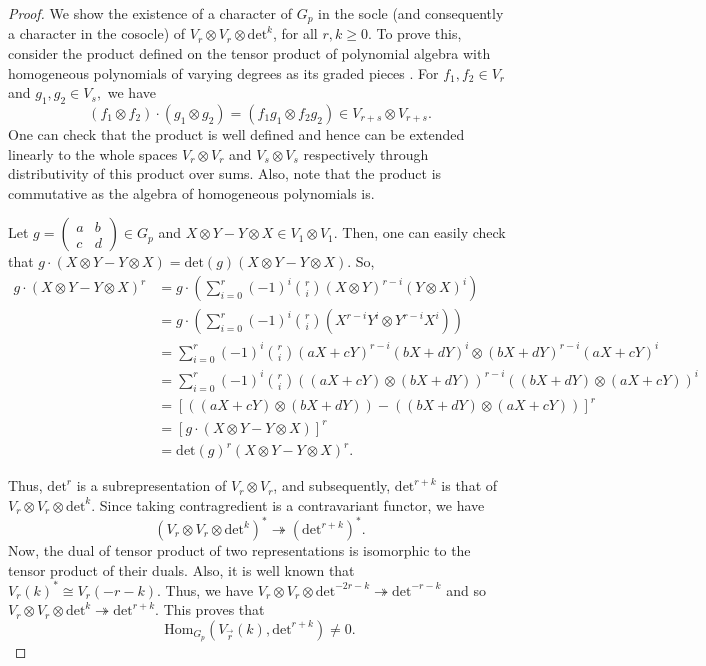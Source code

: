 \documentclass[10pt, reqno]{amsart}
\def\Gp{{G_p}}
\def\xty{{X\otimes Y}}
\def\ytx{{Y\otimes X}}
\numberwithin{equation}{section}
\theoremstyle{remark}
\begin{document}
	\begin{proof}
	    We show the existence of a character of $\Gp$ in the socle (and consequently a character in the cosocle) of $V_{r}\otimes V_{r}\otimes\mathrm{det}^k$, for all $r,k\geq 0.$ To prove this, consider the product defined on the tensor product of polynomial algebra with homogeneous polynomials of varying degrees as its graded pieces \cite{SL}. For $f_1,f_2\in V_r$ and $g_1,g_2\in V_s,$ we have $$(f_1\otimes f_2)\cdot(g_1\otimes g_2)=(f_1g_1\otimes f_2g_2)\in V_{r+s}\otimes V_{r+s}.$$
	One can check that the product is well defined and hence can be extended linearly to the whole spaces $V_r\otimes V_r$ and $V_s\otimes V_s$ respectively through distributivity of this product over sums. Also, note that the product is commutative as the algebra of homogeneous polynomials is.
	
	Let $g=\left(\begin{matrix}
			a & b \\
			c & d
		\end{matrix}\right)\in \Gp$ and $\xty-\ytx\in V_1\otimes V_1.$ Then, one can easily check that $g\cdot(\xty-\ytx)=\mathrm{det}(g)(\xty-\ytx).$ So,	
		\begin{align*}		    			
			g\cdot(\xty-\ytx)^r
			&= \displaystyle{g\cdot\left(\sum\limits_{i=0}^r (-1)^i\binom{r}{i}(\xty)^{r-i}(\ytx)^i\right)} \\
			&=\displaystyle{g\cdot\left(\sum\limits_{i=0}^r (-1)^i\binom{r}{i}(X^{r-i}Y^i\otimes Y^{r-i}X^i)\right)}\\
			&= \displaystyle{\sum\limits_{i=0}^r (-1)^i\binom{r}{i}(aX+cY)^{r-i}(bX+dY)^i\otimes(bX+dY)^{r-i}(aX+cY)^i}\\
			&= \displaystyle{\sum\limits_{i=0}^r (-1)^i\binom{r}{i}((aX+cY)\otimes(bX+dY))^{r-i}((bX+dY)\otimes(aX+cY))^i}\\
			&= \displaystyle{[((aX+cY)\otimes(bX+dY))-((bX+dY)\otimes(aX+cY))]^r}\\
			&= [g\cdot (\xty-\ytx)]^r\\
			&= \mathrm{det}(g)^r(\xty-\ytx)^r.		
		\end{align*}

Thus, $\mathrm{det}^r$ is a subrepresentation of $V_r\otimes V_r$, and subsequently, $\mathrm{det}^{r+k}$ is that of $V_r\otimes V_r\otimes\mathrm{det}^k.$ Since taking contragredient is a contravariant functor, we have $$\left(V_r\otimes V_r\otimes\mathrm{det}^k\right)^*\twoheadrightarrow \left(\mathrm{det}^{r+k}\right)^*.$$
	Now, the dual of tensor product of two representations is isomorphic to the tensor product of their duals. Also, it is well known that $V_r(k)^*\cong V_r(-r-k).$ Thus, we have $V_r\otimes V_r\otimes\mathrm{det}^{-2r-k}\twoheadrightarrow \mathrm{det}^{-r-k}$ and so $V_r\otimes V_r\otimes \mathrm{det}^{k}\twoheadrightarrow \mathrm{det}^{r+k}.$ This proves that
    $$\mathrm{Hom}_{\Gp}(V_{\vec{r}}(k), \mathrm{det}^{r+k})\neq 0. $$
    \end{proof}
	
\end{document}
